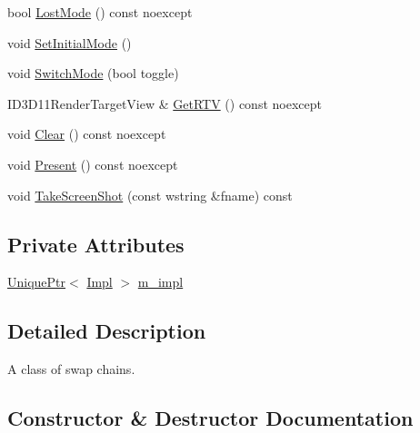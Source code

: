 \begin{DoxyCompactItemize}
\item 
bool \mbox{\hyperlink{classmage_1_1rendering_1_1_swap_chain_a8d4356d1652fca65095bc4db2bd0c1f2}{Lost\+Mode}} () const noexcept
\item 
void \mbox{\hyperlink{classmage_1_1rendering_1_1_swap_chain_a7ceec40e9007d1d6be3bdcd003fe9985}{Set\+Initial\+Mode}} ()
\item 
void \mbox{\hyperlink{classmage_1_1rendering_1_1_swap_chain_a184b5aa11bdc69f7b6077de9ec0c47e0}{Switch\+Mode}} (bool toggle)
\item 
I\+D3\+D11\+Render\+Target\+View \& \mbox{\hyperlink{classmage_1_1rendering_1_1_swap_chain_ab7ef5f87f1870777bdb230e51ebdae96}{Get\+R\+TV}} () const noexcept
\item 
void \mbox{\hyperlink{classmage_1_1rendering_1_1_swap_chain_ab834da2afc837fe4c113f86c300af264}{Clear}} () const noexcept
\item 
void \mbox{\hyperlink{classmage_1_1rendering_1_1_swap_chain_a6739d35cf37b6d50adc70eb09cba2446}{Present}} () const noexcept
\item 
void \mbox{\hyperlink{classmage_1_1rendering_1_1_swap_chain_a833d4eb8c091c49aaedaa3f3a2e6c159}{Take\+Screen\+Shot}} (const wstring \&fname) const
\end{DoxyCompactItemize}
\subsection*{Private Attributes}
\begin{DoxyCompactItemize}
\item 
\mbox{\hyperlink{namespacemage_a3316d7143a973e37adf1110f2e80ca31}{Unique\+Ptr}}$<$ \mbox{\hyperlink{classmage_1_1rendering_1_1_swap_chain_1_1_impl}{Impl}} $>$ \mbox{\hyperlink{classmage_1_1rendering_1_1_swap_chain_a983645d6494b7e731753def5356bb8e6}{m\+\_\+impl}}
\end{DoxyCompactItemize}


\subsection{Detailed Description}
A class of swap chains. 

\subsection{Constructor \& Destructor Documentation}
\mbox{\label{classmage_1_1rendering_1_1_swap_chain_a711f0c9750a2ff68a71bb9e333b2eba7}} 
